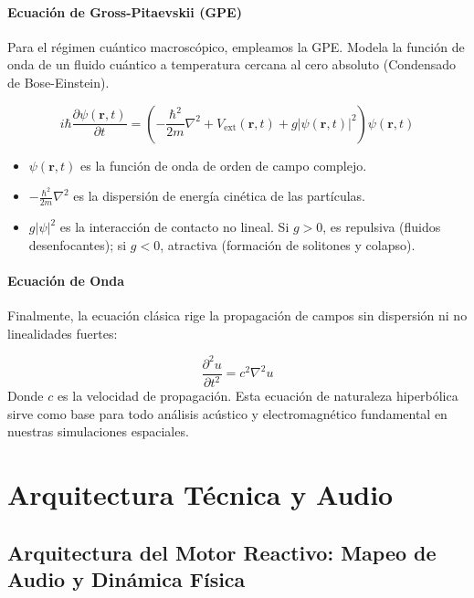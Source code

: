 \documentclass[12pt, openany]{book}
\begin{document}
\subsection{Ecuación de Gross-Pitaevskii (GPE)}

Para el régimen cuántico macroscópico, empleamos la GPE. Modela la función de onda de un fluido cuántico a temperatura cercana al cero absoluto (Condensado de Bose-Einstein).

\begin{equation}
    i \hbar \frac{\partial \psi(\mathbf{r}, t)}{\partial t} = \left( -\frac{\hbar^2}{2m}\nabla^2 + V_{\text{ext}}(\mathbf{r}, t) + g |\psi(\mathbf{r}, t)|^2 \right) \psi(\mathbf{r}, t)
\end{equation}
\begin{itemize}
    \item $\psi(\mathbf{r}, t)$ es la función de onda de orden de campo complejo.
    \item $-\frac{\hbar^2}{2m}\nabla^2$ es la dispersión de energía cinética de las partículas.
    \item $g |\psi|^2$ es la interacción de contacto no lineal. Si $g>0$, es repulsiva (fluidos desenfocantes); si $g<0$, atractiva (formación de solitones y colapso).
\end{itemize}

\subsection{Ecuación de Onda}

Finalmente, la ecuación clásica rige la propagación de campos sin dispersión ni no linealidades fuertes:

\begin{equation}
    \frac{\partial^2 u}{\partial t^2} = c^2 \nabla^2 u
\end{equation}
Donde $c$ es la velocidad de propagación. Esta ecuación de naturaleza hiperbólica sirve como base para todo análisis acústico y electromagnético fundamental en nuestras simulaciones espaciales.

\part{Arquitectura Técnica y Audio}

\chapter{Arquitectura del Motor Reactivo: Mapeo de Audio y Dinámica Física}
\label{ch:arquitectura_motor}
\end{document}
